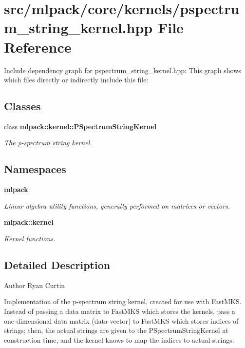 \section{src/mlpack/core/kernels/pspectrum\-\_\-string\-\_\-kernel.hpp File Reference}
\label{pspectrum__string__kernel_8hpp}
Include dependency graph for pspectrum\-\_\-string\-\_\-kernel.\-hpp\-:
This graph shows which files directly or indirectly include this file\-:
\subsection*{Classes}
\begin{DoxyCompactItemize}
\item 
class {\bf mlpack\-::kernel\-::\-P\-Spectrum\-String\-Kernel}
\begin{DoxyCompactList}\small\item\em The p-\/spectrum string kernel. \end{DoxyCompactList}\end{DoxyCompactItemize}
\subsection*{Namespaces}
\begin{DoxyCompactItemize}
\item 
{\bf mlpack}
\begin{DoxyCompactList}\small\item\em Linear algebra utility functions, generally performed on matrices or vectors. \end{DoxyCompactList}\item 
{\bf mlpack\-::kernel}
\begin{DoxyCompactList}\small\item\em Kernel functions. \end{DoxyCompactList}\end{DoxyCompactItemize}


\subsection{Detailed Description}
\begin{DoxyAuthor}{Author}
Ryan Curtin
\end{DoxyAuthor}
Implementation of the p-\/spectrum string kernel, created for use with Fast\-M\-K\-S. Instead of passing a data matrix to Fast\-M\-K\-S which stores the kernels, pass a one-\/dimensional data matrix (data vector) to Fast\-M\-K\-S which stores indices of strings; then, the actual strings are given to the P\-Spectrum\-String\-Kernel at construction time, and the kernel knows to map the indices to actual strings.

